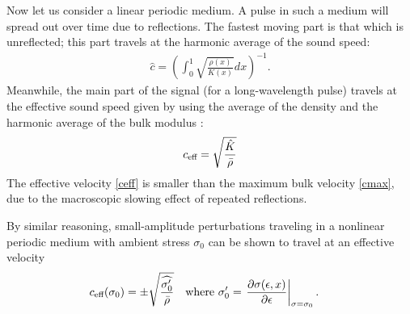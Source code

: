 Now let us consider a linear periodic medium.  A pulse in such a medium
will spread out over time due to reflections.
The fastest moving part is that which is unreflected; this part travels at
the harmonic average of the sound speed:
\begin{align} \label{cmax}
\hat{c} = \left(\int_0^1{\sqrt{\frac{\rho(x)}{K(x)}} dx}\right)^{-1}.
\end{align}
Meanwhile, the main part of the signal (for a long-wavelength pulse) travels
at the effective sound speed given by using the average of the density and the
harmonic average of the bulk modulus \cite{santosa1991}:
\begin{align} \label{ceff}
c_\textup{eff} = \sqrt{\frac{\Kmean}{\rhomean}}
\end{align}
The effective velocity \eqref{ceff} is smaller than the maximum bulk
velocity \eqref{cmax},
due to the macroscopic slowing effect of repeated reflections.

By similar reasoning, small-amplitude perturbations traveling
in a nonlinear periodic medium with ambient stress $\sigma_0$
can be shown to travel at an effective velocity
\begin{align*}
c_\textup{eff}(\sigma_0) & = \pm\sqrt{\frac{\widehat{\sigma'_0}}{\bar{\rho}}}
& \mbox{where }
\sigma'_0 & = \left. \frac{\partial \sigma(\epsilon,x)}{\partial \epsilon}\right|_{\sigma=\sigma_0}.
\end{align*}

